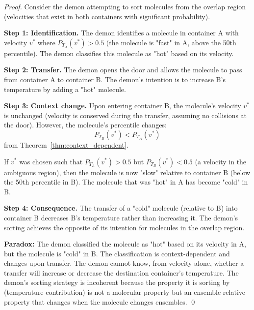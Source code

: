 \documentclass[12pt,a4paper]{article}
\theoremstyle{definition}
\theoremstyle{remark}
\begin{document}
\begin{proof}
Consider the demon attempting to sort molecules from the overlap region (velocities that exist in both containers with significant probability).

\textbf{Step 1: Identification.}
The demon identifies a molecule in container A with velocity $v^*$ where $P_{T_A}(v^*) > 0.5$ (the molecule is "fast" in A, above the 50th percentile). The demon classifies this molecule as "hot" based on its velocity.

\textbf{Step 2: Transfer.}
The demon opens the door and allows the molecule to pass from container A to container B. The demon's intention is to increase B's temperature by adding a "hot" molecule.

\textbf{Step 3: Context change.}
Upon entering container B, the molecule's velocity $v^*$ is unchanged (velocity is conserved during the transfer, assuming no collisions at the door). However, the molecule's percentile changes:
\begin{equation}
P_{T_B}(v^*) < P_{T_A}(v^*)
\end{equation}
from Theorem~\ref{thm:context_dependent}.

If $v^*$ was chosen such that $P_{T_A}(v^*) > 0.5$ but $P_{T_B}(v^*) < 0.5$ (a velocity in the ambiguous region), then the molecule is now "slow" relative to container B (below the 50th percentile in B). The molecule that was "hot" in A has become "cold" in B.

\textbf{Step 4: Consequence.}
The transfer of a "cold" molecule (relative to B) into container B decreases B's temperature rather than increasing it. The demon's sorting achieves the opposite of its intention for molecules in the overlap region.

\textbf{Paradox:}
The demon classified the molecule as "hot" based on its velocity in A, but the molecule is "cold" in B. The classification is context-dependent and changes upon transfer. The demon cannot know, from velocity alone, whether a transfer will increase or decrease the destination container's temperature. The demon's sorting strategy is incoherent because the property it is sorting by (temperature contribution) is not a molecular property but an ensemble-relative property that changes when the molecule changes ensembles. \qed
\end{proof}
\end{document}
